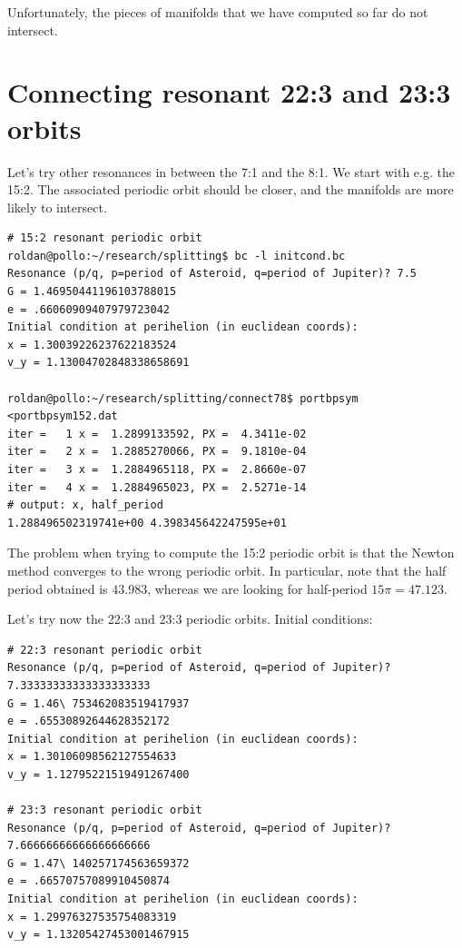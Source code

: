 \documentclass[a4paper]{amsart}
\theoremstyle{remark}
\begin{document}
Unfortunately, the pieces of manifolds that we have computed so far do
not intersect. 

\section{Connecting resonant 22:3 and 23:3 orbits}

Let's try other resonances in between the 7:1 and the
8:1.
We start with e.g. the 15:2. The associated periodic orbit should be closer,
and the manifolds are more likely to intersect.

\begin{verbatim}
# 15:2 resonant periodic orbit
roldan@pollo:~/research/splitting$ bc -l initcond.bc 
Resonance (p/q, p=period of Asteroid, q=period of Jupiter)? 7.5
G = 1.46950441196103788015
e = .66060909407979723042
Initial condition at perihelion (in euclidean coords):
x = 1.30039226237622183524
v_y = 1.13004702848338658691

roldan@pollo:~/research/splitting/connect78$ portbpsym <portbpsym152.dat
iter =   1 x =  1.2899133592, PX =  4.3411e-02
iter =   2 x =  1.2885270066, PX =  9.1810e-04
iter =   3 x =  1.2884965118, PX =  2.8660e-07
iter =   4 x =  1.2884965023, PX =  2.5271e-14
# output: x, half_period
1.288496502319741e+00 4.398345642247595e+01
\end{verbatim}
The problem when trying to compute the 15:2 periodic orbit is that the
Newton method converges to the wrong periodic orbit. In particular,
note that the half period obtained is $43.983$, whereas we are looking for
half-period $15\pi=47.123$.

Let's try now the 22:3 and 23:3 periodic orbits.
Initial conditions:
\begin{verbatim}
# 22:3 resonant periodic orbit
Resonance (p/q, p=period of Asteroid, q=period of Jupiter)? 7.33333333333333333333
G = 1.46\ 753462083519417937
e = .65530892644628352172
Initial condition at perihelion (in euclidean coords):
x = 1.30106098562127554633
v_y = 1.12795221519491267400

# 23:3 resonant periodic orbit
Resonance (p/q, p=period of Asteroid, q=period of Jupiter)? 7.66666666666666666666
G = 1.47\ 140257174563659372
e = .66570757089910450874
Initial condition at perihelion (in euclidean coords):
x = 1.29976327535754083319
v_y = 1.13205427453001467915
\end{verbatim}
\end{document}
